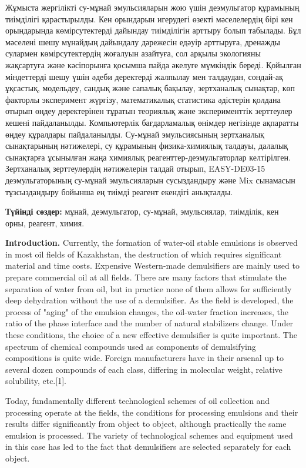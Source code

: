 Жұмыста жергілікті су-мұнай эмульсияларын жою үшін деэмульгатор
құрамының тиімділігі қарастырылды. Кен орындарын игерудегі өзекті
мәселелердің бірі кен орындарында көмірсутектерді дайындау тиімділігін
арттыру болып табылады. Бұл мәселені шешу мұнайдың дайындалу дәрежесін
едәуір арттыруға, дренажды сулармен көмірсутектердің жоғалуын азайтуға,
сол арқылы экологияны жақсартуға және кәсіпорынға қосымша пайда әкелуге
мүмкіндік береді. Қойылған міндеттерді шешу үшін әдеби деректерді
жалпылау мен талдаудан, сондай-ақ ұқсастық, модельдеу, сандық және
сапалық бақылау, зертханалық сынақтар, көп факторлы эксперимент жүргізу,
математикалық статистика әдістерін қолдана отырып өңдеу деректерінен
тұратын теориялық және эксперименттік зерттеулер кешені пайдаланылды.
Компьютерлік бағдарламалық өнімдер негізінде ақпаратты өңдеу құралдары
пайдаланылды. Су-мұнай эмульсиясының зертханалық сынақтарының
нәтижелері, су құрамының физика-химиялық талдауы, далалық сынақтарға
ұсынылған жаңа химиялық реагенттер-деэмульгаторлар келтірілген.
Зертханалық зерттеулердің нәтижелерін талдай отырып, EASY-DE03-15
деэмульгаторының су-мұнай эмульсияларын сусыздандыру және Mix сынамасын
тұзсыздандыру бойынша ең тиімді реагент екендігі анықталды.

\textbf{Түйінді сөздер:} мұнай, деэмульгатор, су-мұнай, эмульсиялар,
тиімділік, кен орны, реагент, химия.

\textbf{Introduction.} Currently, the formation of water-oil stable
emulsions is observed in most oil fields of Kazakhstan, the destruction
of which requires significant material and time costs. Expensive
Western-made demulsifiers are mainly used to prepare commercial oil at
all fields. There are many factors that stimulate the separation of
water from oil, but in practice none of them allows for sufficiently
deep dehydration without the use of a demulsifier. As the field is
developed, the process of "aging" of the emulsion changes, the oil-water
fraction increases, the ratio of the phase interface and the number of
natural stabilizers change. Under these conditions, the choice of a new
effective demulsifier is quite important. The spectrum of chemical
compounds used as components of demulsifying compositions is quite wide.
Foreign manufacturers have in their arsenal up to several dozen
compounds of each class, differing in molecular weight, relative
solubility, etc.{[}1{]}.

Today, fundamentally different technological schemes of oil collection
and processing operate at the fields, the conditions for processing
emulsions and their results differ significantly from object to object,
although practically the same emulsion is processed. The variety of
technological schemes and equipment used in this case has led to the
fact that demulsifiers are selected separately for each object.

